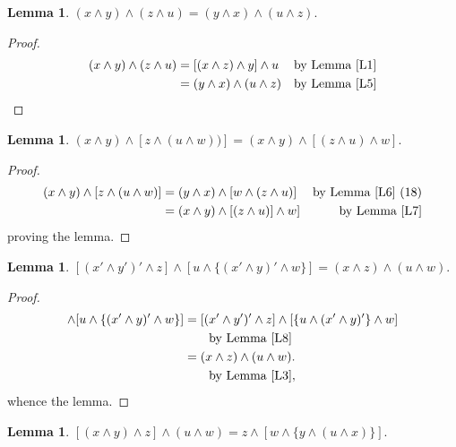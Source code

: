 \documentclass{amsart}
\theoremstyle{plain}
\newtheorem{lemma}[theorem]{Lemma}
\theoremstyle{problem}
\theoremstyle{definition}
\theoremstyle{remark}
\numberwithin{equation}{section}
\begin{document}
\begin{lemma} \label{L7} 
 $(x \land y) \land (z \land u) = (y \land x) \land (u \land z).$  
\end{lemma}

\begin{proof}
\begin{align*}
(x \land y) \land (z \land u) &= [(x \land z) \land y] \land u &\text{by Lemma \ref{L1}}\\ 
                                           &= (y \land x) \land (u \land z) &\text{by Lemma \ref{L5}}  
\end{align*}
\end{proof}

\begin{lemma} \label{L8} 
 $(x \land y) \land [z \land (u \land w))]= (x \land y) \land [(z \land u) \land w].$ %
\end{lemma}

\begin{proof}
\begin{align*}
(x \land y) \land [z \land (u \land w)] &= (y \land x) \land [w \land (z \land u)] &\text{{by Lemma \ref{L6} (18)}}\\ 
                                                         &= (x \land y) \land [(z \land u)] \land w] &\text{by Lemma \ref{L7}}  \\
\end{align*}
proving the lemma.
\end{proof}


\begin{lemma} \label{L9} %
$[(x' \land y')' \land z] \land [u \land \{(x' \land y)' \land  w\}] = (x \land z) \land (u \land w).$ %
\end{lemma}

\begin{proof}
\begin{align*}
[(x' \land y')' \land z] \land [u \land \{(x' \land y)' \land  w\}]
 &=  [(x' \land y')' \land z] \land [\{u \land (x' \land y)' \} \land  w] \\
 &\text{\qquad by Lemma \ref{L8}}\\ %
 &= (x \land z) \land (u \land w).\\ 
 &\text{\qquad by Lemma \ref{L3}}, 
\end{align*}
whence the lemma.
\end{proof}

\begin{lemma} \label{L10}  
 $[(x \land y) \land z] \land (u \land w) = z \land [w \land \{y \land (u \land x)\}]. $ %
\end{lemma}
\end{document}
